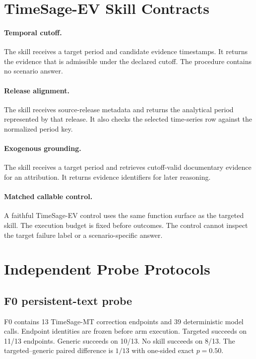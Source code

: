 \section{TimeSage-EV Skill Contracts}
\label{app:contracts}
\paragraph{Temporal cutoff.} The skill receives a target period and candidate evidence timestamps. It returns the evidence that is admissible under the declared cutoff. The procedure contains no scenario answer.

\paragraph{Release alignment.} The skill receives source-release metadata and returns the analytical period represented by that release. It also checks the selected time-series row against the normalized period key.

\paragraph{Exogenous grounding.} The skill receives a target period and retrieves cutoff-valid documentary evidence for an attribution. It returns evidence identifiers for later reasoning.

\paragraph{Matched callable control.} A faithful TimeSage-EV control uses the same function surface as the targeted skill. The execution budget is fixed before outcomes. The control cannot inspect the target failure label or a scenario-specific answer.

\section{Independent Probe Protocols}
\label{app:probes}
\subsection{F0 persistent-text probe}
F0 contains 13 TimeSage-MT correction endpoints and 39 deterministic model calls. Endpoint identities are frozen before arm execution. Targeted succeeds on 11/13 endpoints. Generic succeeds on 10/13. No skill succeeds on 8/13. The targeted--generic paired difference is $1/13$ with one-sided exact $p=0.50$.

